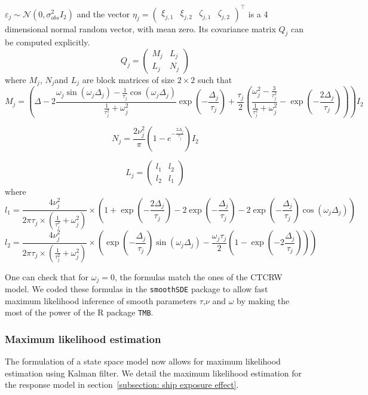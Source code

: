 \documentclass[11pt]{article}
\newcommand {\1}{\mathbb{1}}
\begin{document}
$\varepsilon_j \sim \mathcal{N}(0,\sigma_{obs}^2 I_2)$ and the vector $\eta_j=\begin{pmatrix} \xi_{j,1} & \xi_{j,2} & \zeta_{j,1} & \zeta_{j,2} \end{pmatrix}^\top$ is a 4 dimensional normal random vector, with mean zero. Its covariance matrix $Q_j$ can be computed explicitly.
\begin{equation}
	Q_j=\begin{pmatrix}
		M_j & L_j \\
		L_j & N_j
	\end{pmatrix}
	\label{eq: state space covariance}
\end{equation}
where $M_j$, $N_j$and $L_j$ are block matrices of size $2 \times 2$ such that 
\[M_j=\left( \Delta-2 \frac{\omega_j \sin(\omega_j \Delta_j)-\frac{1}{\tau_j} \cos(\omega_j \Delta_j)}{\frac{1}{\tau_j^2}+\omega_j^2 } \exp\left( -\frac{\Delta_j}{\tau_j} \right) +\frac{\tau_j}{2} \left( \frac{\omega_j^2-\frac{3}{\tau_j^2}}{\frac{1}{\tau_j^2}+\omega_j^2}-\exp\left( -\frac{2\Delta_j}{\tau_j}\right)\right) \right)I_2\]

\[N_j=\frac{2\nu_j^2}{\pi}\left(1-e^{-\frac{2 \Delta_j}{\tau_j}}\right)I_2\]

\[L_j=\begin{pmatrix} l_1 & l_2 \\
	l_2 & l_1\end{pmatrix}\]
where 
\[l_1=\frac{4\nu_j^2}{2 \pi \tau_j \times \left( \frac{1}{\tau_j^2}+\omega_j^2\right)} \times \left( 1+\exp\left( -\frac{2\Delta_j}{\tau_j}\right)-2\exp\left( -\frac{\Delta_j}{\tau_j}\right)-2\exp\left( -\frac{\Delta_j}{\tau_j}\right) \cos(\omega_j \Delta_j)\right)\]
\[l_2=\frac{4\nu_j^2}{2 \pi \tau_j \times \left( \frac{1}{\tau_j^2}+\omega_j^2\right)} \times\left( \exp\left( -\frac{\Delta_j}{\tau_j}\right) \sin(\omega_j \Delta_j)-\frac{\omega_j \tau_j}{2} \left(1-\exp\left( -2 \frac{\Delta_j}{\tau_j}\right) \right)\right)\]

One can check that for $\omega_j=0$, the formulas match the ones of the CTCRW model.
We coded these formulas in the \texttt{smoothSDE} package to allow fast maximum likelihood inference of smooth parameters $\tau$,$\nu$ and $\omega$ by making the most of the power of the R package \texttt{TMB}. 


\subsubsection{Maximum likelihood estimation}
The formulation of a state space model now allows for maximum likelihood estimation using Kalman filter.
We detail the maximum likelihood estimation for the response model in section~\ref{subsection: ship exposure effect}. \\
\end{document}
